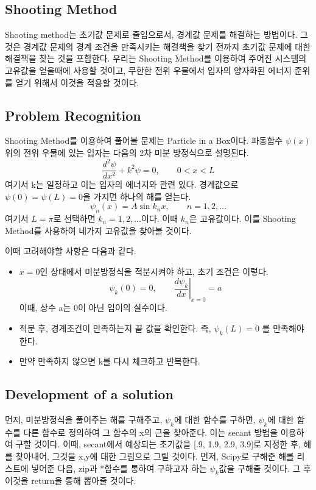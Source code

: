 \documentclass[11pt]{article}
\begin{document}
\subsection{Shooting Method} 
Shooting method는 초기값 문제로 줄임으로서, 경계값 문제를 해결하는 방법이다. 그것은 경계값 문제의 경계 조건을 만족시키는 해결책을 찾기 전까지 초기값 문제에 대한 해결책을 찾는 것을 포함한다. 우리는 Shooting Method를 이용하여 주어진 시스템의 고유값을 얻을때에 사용할 것이고, 무한한 전위 우물에서 입자의 양자화된 에너지 준위를 얻기 위해서 이것을 적용할 것이다.

\subsection{Problem Recognition} 
Shooting Method를 이용하여 풀어볼 문제는 Particle in a Box이다. 
파동함수 $\psi(x)$위의 전위 우물에 있는 입자는 다음의 2차 미분 방정식으로 설명된다.
\begin{equation}
\frac{d^2\psi}{dx^2} + k^2 \psi = 0
,\qquad 0 < x < L
\end{equation}
여기서 k는 일정하고 이는 입자의 에너지와 관련 있다. 경계값으로 $\psi(0) = \psi(L) = 0$을 가지면 하나의 해를 얻는다. 
\begin{equation}
\psi_n(x) = A \sin k_n x
,\qquad
n = 1, 2, \dots
\end{equation}
여기서 $L = \pi$로 선택하면  $k_n = 1, 2, \dots$이다. 이때 $k_n$은 고유값이다. 이를 Shooting Method를 사용하여 네가지 고유값을 찾아볼 것이다.

이때 고려해야할 사항은 다음과 같다.
\begin{itemize}
\item $x = 0$인 상태에서 미분방정식을 적분시켜야 하고, 초기 조건은 이렇다.
\begin{equation}
\psi_k(0) = 0
    ,\qquad
    \left.\frac{d\psi_k}{dx}\right|_{x = 0} = a
    \end{equation}
    이때, 상수 a는 0이 아닌 임이의 실수이다.
\item 적분 후, 경계조건이 만족하는지 끝 값을 확인한다. 즉, $\psi_k(L) = 0$ 를 만족해야 한다.
\item 만약 만족하지 않으면 k를 다시 체크하고 반복한다.
\end{itemize}

\subsection{Development of a solution} 
먼저, 미분방정식을 풀어주는 해를 구해주고, $\psi_{k}$에 대한 함수를 구하면, $\psi_{k}$에 대한 함수를 다른 함수로 정의하여 그 함수의 x의 근을 찾아준다. 이는 secant 방법을 이용하여 구할 것이다. 이때, secant에서 예상되는 초기값을 [.9, 1.9, 2.9, 3.9]로 지정한 후, 해를 찾아내어, 그것을 x,y에 대한 그림으로 그릴 것이다. 먼저, Scipy로 구해준 해를 리스트에 넣어준 다음, zip과 *함수를 통하여 구하고자 하는 $\psi_{k}$값을 구해줄 것이다. 그 후 이것을 return을 통해 뽑아줄 것이다. 
\end{document}
